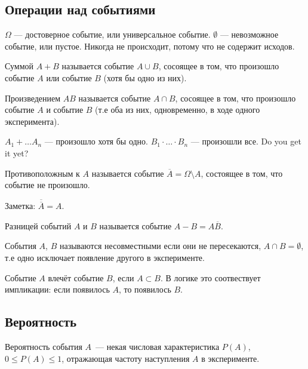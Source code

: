 \subsection{Операции над событиями}
$\Omega$ --- достоверное событие, или универсальное событие.
$\emptyset$ --- невозможное событие, или пустое. 
Никогда не происходит, потому что не содержит исходов.

\begin{definition}
    Суммой $A+B$ называется событие $A \cup B$, сосоящее в том, что произошло событие $A$ или событие $B$ (хотя бы одно из них).
\end{definition}

\begin{definition}
    Произведением $AB$ называется  событие $A\cap B$, сосоящее в том, что произошло событие $A$ и событие $B$ (т.е оба из них, одновременно, в ходе одного эксперимента). 
\end{definition}

$A_1 + \ldots A_n$ --- произошло хотя бы одно.
$B_1 \cdot \ldots \cdot B_n$ --- произошли все. 
Do you get it yet?

\begin{definition}
    Противоположным к $A$ называется событие $\overline{A} = \Omega \setminus A$, состоящее в том, что событие не произошло.
\end{definition}

Заметка: $\overline{\overline{A}} = A$.


\begin{definition}
    Разницей событий $A$ и $B$ называется событие $A-B = A \overline{B}$.
\end{definition}

\begin{definition}
    События $A$, $B$ называются несовместными если они не пересекаются, $A\cap B= \emptyset$, т.е одно исключает появление другого в эксперименте.
\end{definition}

\begin{definition}
    Событие $A$ влечёт событие $B$, если $A\subset B$. 
    В логике это соотвествует импликации: если появилось $A$, то появилось $B$. 
\end{definition}


\subsection{Вероятность}
Вероятность события $A$~--- некая числовая характеристика $P(A)$, $0 \leqslant P(A) \leqslant 1$, отражающая частоту наступления $A$ в эксперименте.

